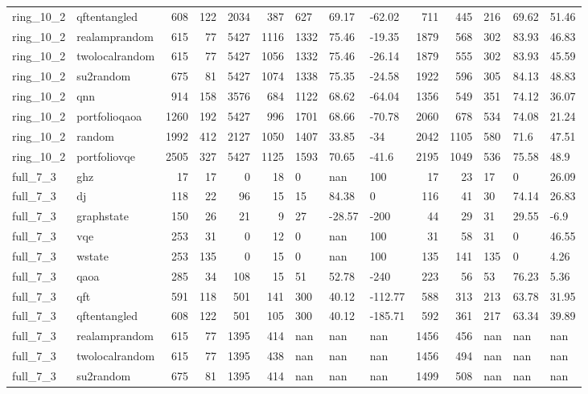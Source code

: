 \begin{longtable}{llrrrrlllrrlll}
ring\_10\_2 & qftentangled & 608 & 122 & 2034 & 387 & 627 & 69.17 & -62.02 & 711 & 445 & 216 & 69.62 & 51.46 \\
ring\_10\_2 & realamprandom & 615 & 77 & 5427 & 1116 & 1332 & 75.46 & -19.35 & 1879 & 568 & 302 & 83.93 & 46.83 \\
ring\_10\_2 & twolocalrandom & 615 & 77 & 5427 & 1056 & 1332 & 75.46 & -26.14 & 1879 & 555 & 302 & 83.93 & 45.59 \\
ring\_10\_2 & su2random & 675 & 81 & 5427 & 1074 & 1338 & 75.35 & -24.58 & 1922 & 596 & 305 & 84.13 & 48.83 \\
ring\_10\_2 & qnn & 914 & 158 & 3576 & 684 & 1122 & 68.62 & -64.04 & 1356 & 549 & 351 & 74.12 & 36.07 \\
ring\_10\_2 & portfolioqaoa & 1260 & 192 & 5427 & 996 & 1701 & 68.66 & -70.78 & 2060 & 678 & 534 & 74.08 & 21.24 \\
ring\_10\_2 & random & 1992 & 412 & 2127 & 1050 & 1407 & 33.85 & -34 & 2042 & 1105 & 580 & 71.6 & 47.51 \\
ring\_10\_2 & portfoliovqe & 2505 & 327 & 5427 & 1125 & 1593 & 70.65 & -41.6 & 2195 & 1049 & 536 & 75.58 & 48.9 \\
full\_7\_3 & ghz & 17 & 17 & 0 & 18 & 0 & nan & 100 & 17 & 23 & 17 & 0 & 26.09 \\
full\_7\_3 & dj & 118 & 22 & 96 & 15 & 15 & 84.38 & 0 & 116 & 41 & 30 & 74.14 & 26.83 \\
full\_7\_3 & graphstate & 150 & 26 & 21 & 9 & 27 & -28.57 & -200 & 44 & 29 & 31 & 29.55 & -6.9 \\
full\_7\_3 & vqe & 253 & 31 & 0 & 12 & 0 & nan & 100 & 31 & 58 & 31 & 0 & 46.55 \\
full\_7\_3 & wstate & 253 & 135 & 0 & 15 & 0 & nan & 100 & 135 & 141 & 135 & 0 & 4.26 \\
full\_7\_3 & qaoa & 285 & 34 & 108 & 15 & 51 & 52.78 & -240 & 223 & 56 & 53 & 76.23 & 5.36 \\
full\_7\_3 & qft & 591 & 118 & 501 & 141 & 300 & 40.12 & -112.77 & 588 & 313 & 213 & 63.78 & 31.95 \\
full\_7\_3 & qftentangled & 608 & 122 & 501 & 105 & 300 & 40.12 & -185.71 & 592 & 361 & 217 & 63.34 & 39.89 \\
full\_7\_3 & realamprandom & 615 & 77 & 1395 & 414 & nan & nan & nan & 1456 & 456 & nan & nan & nan \\
full\_7\_3 & twolocalrandom & 615 & 77 & 1395 & 438 & nan & nan & nan & 1456 & 494 & nan & nan & nan \\
full\_7\_3 & su2random & 675 & 81 & 1395 & 414 & nan & nan & nan & 1499 & 508 & nan & nan & nan \\

\end{longtable}
